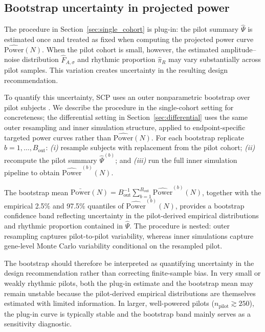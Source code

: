 \documentclass{article}
\begin{document}
\subsection{Bootstrap uncertainty in projected power}
\label{sec:bootstrap}

The procedure in Section~\ref{sec:single_cohort} is plug-in: the pilot summary
$\hat{\Psi}$ is estimated once and treated as fixed when computing the projected
power curve $\widehat{\mathrm{Power}}(N)$. When the pilot cohort is small,
however, the estimated amplitude--noise distribution
$\hat{F}_{A,\sigma}$ and rhythmic proportion $\hat{\pi}_R$ may vary
substantially across pilot samples. This variation creates uncertainty in the
resulting design recommendation.

To quantify this uncertainty, \textsc{SCP} uses an outer nonparametric
bootstrap over pilot subjects \citep{efron1979bootstrap}. We describe the
procedure in the single-cohort setting for concreteness; the differential
setting in Section~\ref{sec:differential} uses the same outer resampling and
inner simulation structure, applied to endpoint-specific targeted power curves
rather than $\widehat{\mathrm{Power}}(N)$. For each bootstrap replicate
$b = 1, \ldots, B_{\mathrm{out}}$: \emph{(i)} resample subjects with replacement
from the pilot cohort; \emph{(ii)} recompute the pilot summary
$\hat{\Psi}^{(b)}$; and \emph{(iii)} run the full inner simulation pipeline to
obtain $\widehat{\mathrm{Power}}^{(b)}(N)$.

The bootstrap mean
$\bar{\mathrm{Power}}(N)
=
B_{\mathrm{out}}^{-1}
\sum_{b=1}^{B_{\mathrm{out}}}
\widehat{\mathrm{Power}}^{(b)}(N)$,
together with the empirical 2.5\% and 97.5\% quantiles of
$\widehat{\mathrm{Power}}^{(b)}(N)$, provides a bootstrap confidence band
reflecting uncertainty in the pilot-derived empirical distributions and
rhythmic proportion contained in $\hat{\Psi}$. The procedure is nested:
outer resampling captures pilot-to-pilot variability, whereas inner simulations
capture gene-level Monte Carlo variability conditional on the resampled pilot.

The bootstrap should therefore be interpreted as quantifying uncertainty in the
design recommendation rather than correcting finite-sample bias. In very small
or weakly rhythmic pilots, both the plug-in estimate and the bootstrap mean may
remain unstable because the pilot-derived empirical distributions are themselves
estimated with limited information. In larger, well-powered pilots
($n_{\mathrm{pilot}} \gtrsim 250$), the plug-in curve is typically stable and
the bootstrap band mainly serves as a sensitivity diagnostic.
\end{document}
